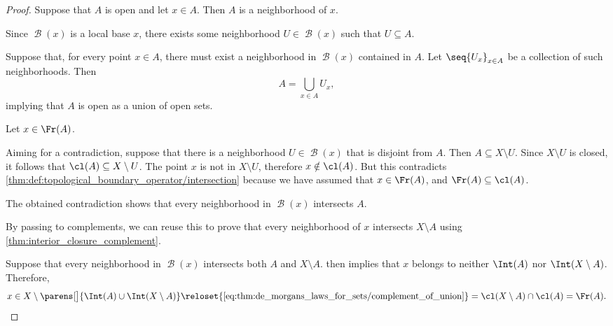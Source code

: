 \begin{proof}

  \SufficiencySubProof* Suppose that \( A \) is open and let \( x \in A \). Then \( A \) is a neighborhood of \( x \).

  Since \( \mscrB(x) \) is a local base \( x \), there exists some neighborhood \( U \in \mscrB(x) \) such that \( U \subseteq A \).

  \NecessitySubProof* Suppose that, for every point \( x \in A \), there must exist a neighborhood in \( \mscrB(x) \) contained in \( A \). Let \( \seq{ U_x }_{x \in A} \) be a collection of such neighborhoods. Then
  \begin{equation*}
    A = \bigcup_{x \in A} U_x,
  \end{equation*}
  implying that \( A \) is open as a union of open sets.


  \SufficiencySubProof* Let \( x \in \Fr(A) \).

  Aiming for a contradiction, suppose that there is a neighborhood \( U \in \mscrB(x) \) that is disjoint from \( A \). Then \( A \subseteq X \setminus U \). Since \( X \setminus U \) is closed, it follows that \( \cl(A) \subseteq X \setminus U \). The point \( x \) is not in \( X \setminus U \), therefore \( x \notin \cl(A) \). But this contradicts \cref{thm:def:topological_boundary_operator/intersection} because we have assumed that \( x \in \Fr(A) \), and \( \Fr(A) \subseteq \cl(A) \).

  The obtained contradiction shows that every neighborhood in \( \mscrB(x) \) intersects \( A \).

  By passing to complements, we can reuse this to prove that every neighborhood of \( x \) intersects \( X \setminus A \) using \cref{thm:interior_closure_complement}.

  \NecessitySubProof* Suppose that every neighborhood in \( \mscrB(x) \) intersects both \( A \) and \( X \setminus A \).  then implies that \( x \) belongs to neither \( \Int(A) \) nor \( \Int(X \setminus A) \). Therefore,
  \begin{equation*}
    x
    \in
    X \setminus \parens[\big]{ \Int(A) \cup \Int(X \setminus A) }
    \reloset {\eqref{eq:thm:de_morgans_laws_for_sets/complement_of_union}} =
    \cl(X \setminus A) \cap \cl(A)
    =
    \Fr(A).
  \end{equation*}


\end{proof}
